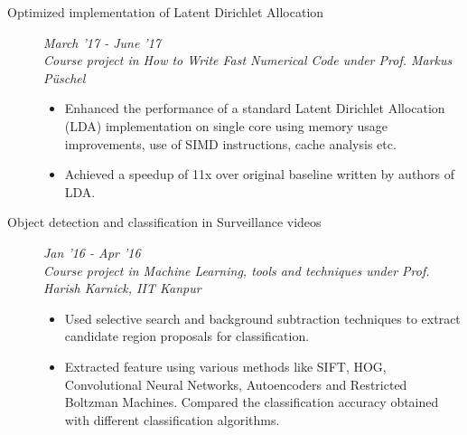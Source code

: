 \documentclass[9pt]{article}
\newenvironment{changemargin}[2]{%
  \begin{list}{}{%
    \setlength{\topsep}{0pt}%
    \setlength{\leftmargin}{#1}%
    \setlength{\rightmargin}{#2}%
    \setlength{\listparindent}{\parindent}%
    \setlength{\itemindent}{\parindent}%
    \setlength{\parsep}{\parskip}%
  }%
  \item[]}{\end{list}
}
\newenvironment{body} {
	\vspace*{-16pt}
	\begin{changemargin}{-0.6in}{-0.65in}
  }	
	{\end{changemargin}
}
\begin{document}
\begin{body}
\begin{description}
	\item[\normalsize{Optimized implementation of Latent Dirichlet Allocation}]
	\hfill \textit{March '17 - June '17} \\
	\textit{Course project in How to Write Fast Numerical Code under Prof. Markus P{\"u}schel}
	\begin{itemize}
		\item Enhanced the performance of a standard Latent Dirichlet Allocation (LDA)
		implementation on single core using memory usage improvements, use of SIMD instructions, cache analysis etc.
		\item Achieved a speedup of 11x over original baseline written by authors of LDA.
	\end{itemize}
      
	 \item[\normalsize{Object detection and classification in Surveillance videos}] \hfill  \textit{Jan '16 - Apr '16} \\
	  \textit{Course project in Machine Learning, tools and techniques under Prof. Harish Karnick, IIT Kanpur}
	  \begin{itemize}
            \item Used selective search and background subtraction techniques to extract candidate region proposals for classification. 
            \item Extracted feature using various methods like SIFT, HOG, Convolutional Neural Networks, Autoencoders and Restricted Boltzman Machines. Compared the classification accuracy obtained with different classification algorithms.
	  \end{itemize}



\end{description}
\end{body}
\end{document}
